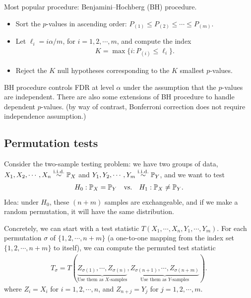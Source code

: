 \documentclass[11pt,letterpaper]{article}
\numberwithin{assumption}{lecture}
\numberwithin{theorem}{lecture}
\numberwithin{proposition}{lecture}
\numberwithin{lemma}{lecture}
\numberwithin{claim}{lecture}
\numberwithin{corollary}{lecture}
\numberwithin{definition}{lecture}
\numberwithin{conjecture}{lecture}
\numberwithin{remark}{lecture}
\numberwithin{example}{lecture}
\numberwithin{equation}{lecture}
\begin{document}
Most popular procedure: Benjamini--Hochberg (BH) procedure.
\begin{itemize}
  \item Sort the $p$-values in ascending order: $P_{(1)} \leq P_{(2)} \leq \cdots \leq P_{(m)}$.
  \item Let $\ell_i = i \alpha / m$, for $i = 1, 2, \cdots, m$, and compute the index
  \begin{align*}
    K = \max \{ i: P_{(i)} \leq \ell_i \}.
  \end{align*}
  \item Reject the $K$ null hypotheses corresponding to the $K$ smallest $p$-values.
\end{itemize}
BH procedure controls FDR at level $\alpha$ under the assumption that the $p$-values are independent. There are also some extensions of BH procedure to handle dependent $p$-values. (by way of contrast, Bonferroni correction does not require independence assumption.)

\subsection{Permutation tests}
Consider the two-sample testing problem: we have two groups of data, $X_1, X_2, \cdots, X_n \overset{\mathrm{i.i.d.}}{\sim} {\mathbb{P}}_{X}$ and $Y_1, Y_2, \cdots, Y_m \overset{\mathrm{i.i.d.}}{\sim} {\mathbb{P}}_{Y}$, and we want to test
\begin{align*}
  H_0: {\mathbb{P}}_{X} = {\mathbb{P}}_{Y} \quad \text{vs.} \quad H_1: {\mathbb{P}}_{X} \neq {\mathbb{P}}_{Y}.
\end{align*}
Idea: under $H_0$, these $(n + m)$ samples are exchangeable, and if we make a random permutation, it will have the same distribution.

Concretely, we can start with a test statistic $T(X_1, \cdots, X_n, Y_1, \cdots, Y_m)$. For each permutation $\sigma$ of $\{1, 2, \cdots, n + m\}$ (a one-to-one mapping from the index set $\{1, 2, \cdots, n + m\}$ to itself), we can compute the permuted test statistic
\begin{align*}
  T_\sigma = T(\underbrace{Z_{\sigma(1)}, \cdots, Z_{\sigma(n)}}_{\text{Use them as $X$-samples}}, \underbrace{Z_{\sigma(n+1)}, \cdots, Z_{\sigma(n+m)}}_{\text{Use them as $Y$-samples}}).
\end{align*}
where $Z_i = X_i$ for $i = 1, 2, \cdots, n$, and $Z_{n+j} = Y_j$ for $j = 1, 2, \cdots, m$.
\end{document}
